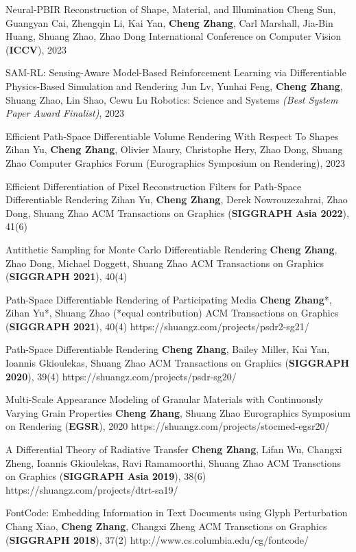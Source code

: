 \begin{cvpublications}{}
    \cvpublication
	{Neural-PBIR Reconstruction of Shape, Material, and Illumination}
	{Cheng Sun, Guangyan Cai, Zhengqin Li, Kai Yan, \textbf{Cheng Zhang}, Carl Marshall, Jia-Bin Huang, Shuang Zhao, Zhao Dong}
	{International Conference on Computer Vision (\textbf{ICCV}), 2023}
	{}

    \cvpublication
	{SAM-RL: Sensing-Aware Model-Based Reinforcement Learning via Differentiable Physics-Based Simulation and Rendering}
	{Jun Lv, Yunhai Feng, \textbf{Cheng Zhang}, Shuang Zhao, Lin Shao, Cewu Lu}
	{Robotics: Science and Systems \emph{(Best System Paper Award Finalist)}, 2023}
	{}


    \cvpublication
	{Efficient Path-Space Differentiable Volume Rendering With Respect To Shapes}
	{Zihan Yu, \textbf{Cheng Zhang}, Olivier Maury, Christophe Hery, Zhao Dong, Shuang Zhao}
	{Computer Graphics Forum (Eurographics Symposium on Rendering), 2023}
	{}

    \cvpublication
	{Efficient Differentiation of Pixel Reconstruction Filters for Path-Space Differentiable Rendering}
	{Zihan Yu, \textbf{Cheng Zhang},  Derek Nowrouzezahrai, Zhao Dong, Shuang Zhao}
	{ACM Transactions on Graphics (\textbf{SIGGRAPH Asia 2022}), 41(6)}
	{}

    \cvpublication
	{Antithetic Sampling for Monte Carlo Differentiable Rendering}
	{\textbf{Cheng Zhang}, Zhao Dong, Michael Doggett, Shuang Zhao}
	{ACM Transactions on Graphics (\textbf{SIGGRAPH 2021}), 40(4)}
	{}


    \cvpublication
	{Path-Space Differentiable Rendering of Participating Media}
	{\textbf{Cheng Zhang}*, Zihan Yu*, Shuang Zhao (*equal contribution)}
	{ACM Transactions on Graphics (\textbf{SIGGRAPH 2021}), 40(4)}
	{https://shuangz.com/projects/psdr2-sg21/}


    \cvpublication
	{Path-Space Differentiable Rendering}
	{\textbf{Cheng Zhang}, Bailey Miller, Kai Yan, Ioannis Gkioulekas, Shuang Zhao}
	{ACM Transactions on Graphics (\textbf{SIGGRAPH 2020}), 39(4)}
	{https://shuangz.com/projects/psdr-sg20/}

    \cvpublication
	{Multi-Scale Appearance Modeling of Granular Materials with Continuously Varying Grain Properties}
	{\textbf{Cheng Zhang}, Shuang Zhao}
	{Eurographics Symposium on Rendering (\textbf{EGSR}), 2020}
	{https://shuangz.com/projects/stocmed-egsr20/}

    \cvpublication
	{A Differential Theory of Radiative Transfer}
	{\textbf{Cheng Zhang}, Lifan Wu, Changxi Zheng, Ioannis Gkioulekas, Ravi Ramamoorthi, Shuang Zhao}
	{ACM Transctions on Graphics (\textbf{SIGGRAPH Asia 2019}), 38(6)}
	{https://shuangz.com/projects/dtrt-sa19/}

	\cvpublication
	{FontCode: Embedding Information in Text Documents using Glyph Perturbation}
	{Chang Xiao, \textbf{Cheng Zhang}, Changxi Zheng}
	{ACM Transctions on Graphics (\textbf{SIGGRAPH 2018}), 37(2)}
	{http://www.cs.columbia.edu/cg/fontcode/}

\end{cvpublications}
